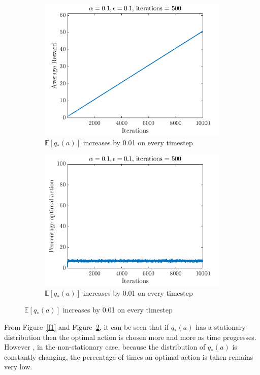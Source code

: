 \documentclass[10pt]{article}
\begin{document}
\begin{figure}[H]
	\newline
		\begin{subfigure}{0.45\textwidth}
			\includegraphics[width=\linewidth]{ex_2_5_fig_2a}
			\caption{$\mathbb{E}\left[ q_{*}(a) \right]$ increases by 0.01 on every timestep}
		\end{subfigure}
		\begin{subfigure}{0.45\textwidth}
			\includegraphics[width=\linewidth]{ex_2_5_fig_2b}
			\caption{$\mathbb{E}\left[ q_{*}(a) \right]$ increases by 0.01 on every timestep}
			\label{f2}
		\end{subfigure}
	\end{figure}
	From Figure~\ref{f1} and Figure~\ref{f2}, it can be seen that if $q_{*}(a)$ has a stationary distribution then the optimal action is chosen more and more as time progresses. However , in the non-stationary case, because the distribution of $q_{*}(a)$ is constantly changing, the percentage of times an optimal action is taken remains very low.
\end{document}
